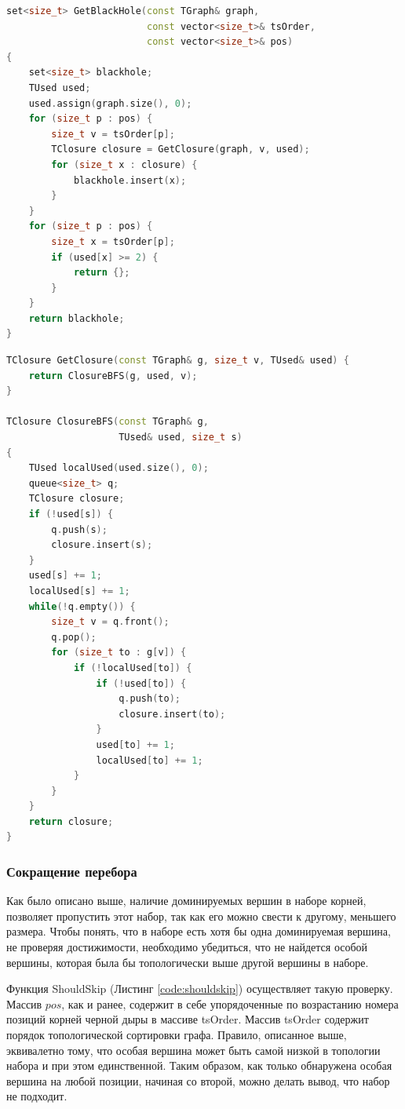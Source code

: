 \documentclass[12pt,a4paper,oneside,openany]{article}
\theoremstyle{definition}
\theoremstyle{lemma}
\theoremstyle{remark}
\begin{document}
\begin{lstlisting}[language=C++, caption=Построение черной дыры по набору корней, label=code:reachability]
set<size_t> GetBlackHole(const TGraph& graph,
                         const vector<size_t>& tsOrder,
                         const vector<size_t>& pos)
{
    set<size_t> blackhole;
    TUsed used;
    used.assign(graph.size(), 0);
    for (size_t p : pos) {
        size_t v = tsOrder[p];
        TClosure closure = GetClosure(graph, v, used);
        for (size_t x : closure) {
            blackhole.insert(x);
        }
    }
    for (size_t p : pos) {
        size_t x = tsOrder[p];
        if (used[x] >= 2) {
            return {};
        }
    }
    return blackhole;
}
\end{lstlisting}

\begin{lstlisting}[language=C++, caption=Обход замыкания данной вершины, label=code:getclosure]
TClosure GetClosure(const TGraph& g, size_t v, TUsed& used) {
    return ClosureBFS(g, used, v);
}

TClosure ClosureBFS(const TGraph& g,
                    TUsed& used, size_t s)
{
    TUsed localUsed(used.size(), 0);
    queue<size_t> q;
    TClosure closure;
    if (!used[s]) {
        q.push(s);
        closure.insert(s);
    }
    used[s] += 1;
    localUsed[s] += 1;
    while(!q.empty()) {
        size_t v = q.front();
        q.pop();
        for (size_t to : g[v]) {
            if (!localUsed[to]) {
                if (!used[to]) {
                    q.push(to);
                    closure.insert(to);
                }
                used[to] += 1;
                localUsed[to] += 1;
            }
        }
    }
    return closure;
}
\end{lstlisting}

\subsubsection{Сокращение перебора}\label{subsubsec:shouldskip}

Как было описано выше, наличие доминируемых вершин в наборе корней,
позволяет пропустить этот набор, так как его можно свести к другому,
меньшего размера. Чтобы понять, что в наборе есть хотя бы одна
доминируемая вершина, не проверяя достижимости,
необходимо убедиться, что не найдется особой вершины,
которая была бы топологически выше другой вершины в наборе.

Функция ShouldSkip (Листинг \ref{code:shouldskip}) осуществляет такую проверку.
Массив $pos$, как и ранее, содержит в себе упорядоченные по
возрастанию номера позиций корней черной дыры в массиве tsOrder.
Массив tsOrder содержит порядок топологической сортировки графа.
Правило, описанное выше, эквивалетно тому, что особая вершина может быть
самой низкой в топологии набора и при этом единственной.
Таким образом, как только обнаружена особая вершина на любой
позиции, начиная со второй, можно делать вывод, что набор не подходит.
\end{document}
